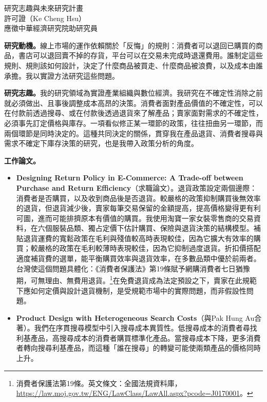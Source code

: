 \documentclass[11pt,letterpaper]{article}
\begin{document}
\begin{center}
{\Large 研究志趣與未來研究計畫}\\[0.25em]
許可證（Ke Cheng Hsu）\\[0.15em]
{\small 應徵中華經濟研究院助研究員}
\end{center}

\noindent\textbf{研究動機。}線上市場的運作依賴關於「反悔」的規則：消費者可以退回已購買的商品，書店可以退回賣不掉的存貨，平台可以在交易未完成時退還費用。誰制定這些規則、規則該如何設計，決定了什麼商品被買走、什麼商品被浪費，以及成本由誰承擔。我以實證方法研究這些問題。

\medskip
\noindent\textbf{研究志趣。}我的研究領域為實證產業組織與數位經濟。我研究在不確定性消除之前就必須做出、且事後調整成本高昂的決策。消費者面對產品價值的不確定性，可以在付款前透過搜尋、或在付款後透過退貨來了解產品；賣家面對需求的不確定性，必須事先訂定價格與庫存。一項看似修正某一環節的政策，往往扭曲另一環節，而兩個環節是同時決定的。這種共同決定的關係，貫穿我在產品退貨、消費者搜尋與需求不確定下庫存決策的研究，也是我帶入政策分析的角度。

\medskip
\noindent\textbf{工作論文。}
\begin{itemize}[leftmargin=1.6em,itemsep=0.2em,topsep=0.1em,parsep=0.1em]
\item \textbf{Designing Return Policy in E-Commerce: A Trade-off between Purchase and Return Efficiency}（求職論文）。退貨政策設定兩個邊際：消費者是否購買，以及收到商品後是否退貨。較嚴格的政策抑制購買後無效率的退貨，但退貨減少後，賣家每筆交易保留的金額提高，提高價格變得更有利可圖，進而可能排擠原本有價值的購買。我使用淘寶一家女裝零售商的交易資料，在六個服裝品類、獨占定價下估計購買、保險與退貨決策的結構模型。補貼退貨運費的寬鬆政策在毛利與殘值較高時表現較佳，因為它擴大有效率的購買；較嚴格的政策在毛利較薄時表現較佳，因為它抑制過度退貨。折扣價搭配適度補貨費的選單，能平衡購買效率與退貨效率，在多數品類中優於前兩者。台灣使這個問題具體化：《消費者保護法》第19條賦予網購消費者七日猶豫期，可無理由、無費用退貨。\footnote{消費者保護法第19條。英文條文：全國法規資料庫，\url{https://law.moj.gov.tw/ENG/LawClass/LawAll.aspx?pcode=J0170001}。}在免費退貨成為法定預設之下，賣家在此規範下應如何定價與設計退貨機制，是受規範市場中的實際問題，而非假設性問題。
\item \textbf{Product Design with Heterogeneous Search Costs}（與Pak Hung Au合著）。我們在序貫搜尋模型中引入搜尋成本異質性。低搜尋成本的消費者尋找利基產品，高搜尋成本的消費者購買標準化產品。當搜尋成本下降，更多消費者轉向搜尋利基產品，而這種「誰在搜尋」的轉變可能使兩類產品的價格同時上升。
\end{itemize}
\end{document}
